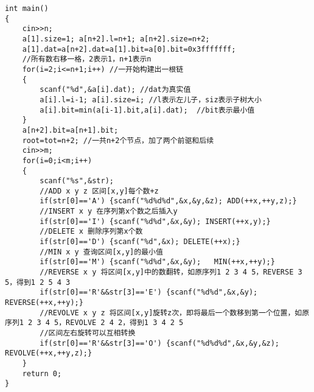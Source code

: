 \documentclass[twoside]{article}
\begin{document}
\begin{lstlisting}
int main()
{ 
	cin>>n;
	a[1].size=1; a[n+2].l=n+1; a[n+2].size=n+2;
	a[1].dat=a[n+2].dat=a[1].bit=a[0].bit=0x3fffffff;
	//所有数右移一格，2表示1，n+1表示n
	for(i=2;i<=n+1;i++) //一开始构建出一根链
	{
		scanf("%d",&a[i].dat); //dat为真实值
		a[i].l=i-1; a[i].size=i; //l表示左儿子，siz表示子树大小
		a[i].bit=min(a[i-1].bit,a[i].dat);  //bit表示最小值
	}
	a[n+2].bit=a[n+1].bit;
	root=tot=n+2; //一共n+2个节点，加了两个前驱和后续
	cin>>m;
	for(i=0;i<m;i++)
	{
		scanf("%s",&str);
		//ADD x y z 区间[x,y]每个数+z
		if(str[0]=='A') {scanf("%d%d%d",&x,&y,&z); ADD(++x,++y,z);}
		//INSERT x y 在序列第x个数之后插入y
		if(str[0]=='I') {scanf("%d%d",&x,&y); INSERT(++x,y);}
		//DELETE x 删除序列第x个数
		if(str[0]=='D')	{scanf("%d",&x); DELETE(++x);}
		//MIN x y 查询区间[x,y]的最小值
		if(str[0]=='M') {scanf("%d%d",&x,&y);	MIN(++x,++y);}	
		//REVERSE x y 将区间[x,y]中的数翻转，如原序列1 2 3 4 5，REVERSE 3 5，得到1 2 5 4 3	
		if(str[0]=='R'&&str[3]=='E') {scanf("%d%d",&x,&y);	REVERSE(++x,++y);}
		//REVOLVE x y z 将区间[x,y]旋转z次，即将最后一个数移到第一个位置，如原序列1 2 3 4 5，REVOLVE 2 4 2，得到1 3 4 2 5
		//区间左右旋转可以互相转换 
		if(str[0]=='R'&&str[3]=='O') {scanf("%d%d%d",&x,&y,&z);	REVOLVE(++x,++y,z);}		
	}
	return 0;
}\end{lstlisting}
\end{document}
